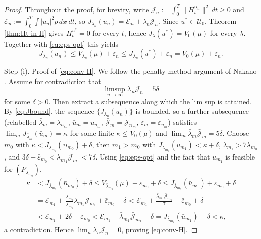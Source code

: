 \documentclass[11pt,leqno]{article}
\theoremstyle{plain}
\theoremstyle{remark}
\theoremstyle{definition}
\numberwithin{equation}{section}
\numberwithin{figure}{section}
\numberwithin{table}{section}
\begin{document}
\begin{proof}
Throughout the proof, for brevity, write
$\mathcal{J}_n:=\int_0^T\|H_t^{u_n}\|^2\,dt\ge 0$ and
$\mathcal{E}_n:=\int_0^T\int|u_n|^2p\,dx\,dt$, so
$J_{\lambda_n}(u_n)=\mathcal{E}_n+\lambda_n\mathcal{J}_n$.
Since $u^\ast\in\mathcal{U}_0$, Theorem
\ref{thm:Ht-in-H} gives $H_t^{u^\ast}=0$ for every $t$, hence
$J_\lambda(u^\ast)=V_0(\mu)$ for every $\lambda$.  Together with
\eqref{eq:eps-opt} this yields
\begin{equation}\label{eq:Jbound}
 J_{\lambda_n}(u_n)\le V_{\lambda_n}(\mu)+\varepsilon_n
 \le J_{\lambda_n}(u^\ast)+\varepsilon_n = V_0(\mu)+\varepsilon_n.
\end{equation}

Step (i). Proof of \eqref{eq:conv-H}.  We follow the
penalty-method argument of Nakano \cite[Theorem 3.1]{nak:2024sb}. 
Assume for contradiction that
\[
 \limsup_{n\to\infty}\lambda_n\mathcal{J}_n=5\delta
\]
for some $\delta>0$. Then extract a subsequence along which the lim sup is attained.
By \eqref{eq:Jbound}, the sequence $\{J_{\lambda_n}(u_n)\}$ is bounded, so a
further subsequence (relabelled $\bar\lambda_m=\lambda_{n_m}$,
$\bar u_m=u_{n_m}$, $\bar{\mathcal J}_m=\mathcal{J}_{n_m}$,
$\bar\varepsilon_m=\varepsilon_{n_m}$) satisfies
$\lim_m J_{\bar\lambda_m}(\bar u_m)=\kappa$ for some finite
$\kappa\le V_0(\mu)$ and
$\lim_m\bar\lambda_m\bar{\mathcal J}_m=5\delta$.  Choose $m_0$ with
$\kappa<J_{\bar\lambda_{m_0}}(\bar u_{m_0})+\delta$, then $m_1>m_0$
with $J_{\bar\lambda_{m_1}}(\bar u_{m_1})<\kappa+\delta$,
$\bar\lambda_{m_1}>7\bar\lambda_{m_0}$, and
$3\delta+\bar\varepsilon_{m_0}<\bar\lambda_{m_1}\bar{\mathcal J}_{m_1}<7\delta$.
Using \eqref{eq:eps-opt} and the fact that $u_{m_1}$ is feasible for
$(P_{\bar\lambda_{m_0}})$,
\begin{align*}
 \kappa
 &< J_{\bar\lambda_{m_0}}(\bar u_{m_0}) + \delta
 \le V_{\bar\lambda_{m_0}}(\mu)+\bar\varepsilon_{m_0}+\delta
 \le J_{\bar\lambda_{m_0}}(\bar u_{m_1})+\bar\varepsilon_{m_0}+\delta\\
 &= \mathcal{E}_{m_1}+\frac{\bar\lambda_{m_0}}{\bar\lambda_{m_1}}
     \bar\lambda_{m_1}\bar{\mathcal J}_{m_1}
     +\bar\varepsilon_{m_0}+\delta
 < \mathcal{E}_{m_1}+\frac{\bar\lambda_{m_1}\bar{\mathcal J}_{m_1}}{7}
     +\bar\varepsilon_{m_0}+\delta\\
 &< \mathcal{E}_{m_1} + 2\delta + \bar\varepsilon_{m_0}
 < \mathcal{E}_{m_1}+\bar\lambda_{m_1}\bar{\mathcal J}_{m_1}-\delta
 = J_{\bar\lambda_{m_1}}(\bar u_{m_1})-\delta
 < \kappa,
\end{align*}
a contradiction.  Hence $\lim_n\lambda_n\mathcal{J}_n=0$, proving
\eqref{eq:conv-H}.


\end{proof}
\end{document}

